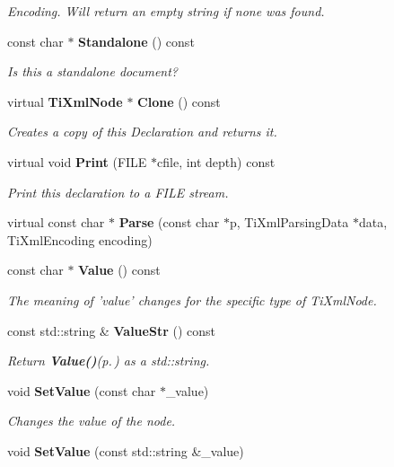 \begin{CompactItemize}
\begin{CompactList}\small\item\em Encoding. Will return an empty string if none was found. \item\end{CompactList}\item 
const char $\ast$ {\bf Standalone} () const\label{classTiXmlDeclaration_TiXmlDeclarationa8}

\begin{CompactList}\small\item\em Is this a standalone document? \item\end{CompactList}\item 
virtual {\bf Ti\-Xml\-Node} $\ast$ {\bf Clone} () const\label{classTiXmlDeclaration_TiXmlDeclarationa9}

\begin{CompactList}\small\item\em Creates a copy of this Declaration and returns it. \item\end{CompactList}\item 
virtual void {\bf Print} (FILE $\ast$cfile, int depth) const\label{classTiXmlDeclaration_TiXmlDeclarationa10}

\begin{CompactList}\small\item\em Print this declaration to a FILE stream. \item\end{CompactList}\item 
virtual const char $\ast$ {\bf Parse} (const char $\ast$p, Ti\-Xml\-Parsing\-Data $\ast$data, Ti\-Xml\-Encoding encoding)\label{classTiXmlDeclaration_TiXmlDeclarationa11}

\item 
const char $\ast$ {\bf Value} () const
\begin{CompactList}\small\item\em The meaning of 'value' changes for the specific type of Ti\-Xml\-Node. \item\end{CompactList}\item 
const std::string \& {\bf Value\-Str} () const
\begin{CompactList}\small\item\em Return {\bf Value()}{\rm (p.\,\pageref{classTiXmlNode_TiXmlUnknowna7})} as a std::string. \item\end{CompactList}\item 
void {\bf Set\-Value} (const char $\ast$\_\-value)
\begin{CompactList}\small\item\em Changes the value of the node. \item\end{CompactList}\item 
void {\bf Set\-Value} (const std::string \&\_\-value)\label{classTiXmlNode_TiXmlUnknowna10}


\end{CompactItemize}
